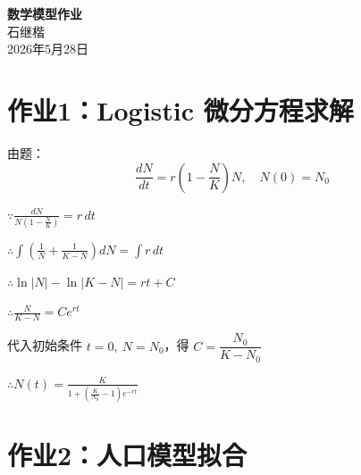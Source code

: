 \documentclass{article}
\begin{document}
	
	\begin{center}
		{\LARGE \textbf{数学模型作业}} \\[0.5cm]
		{\large 石继楷 } \\[0.3cm]
		{\large 2026年5月28日}
	\end{center}
	
	\section{作业1：Logistic 微分方程求解}
	由题：
	\[
	\frac{dN}{dt} = r\left(1-\frac{N}{K}\right)N,\quad N(0)=N_0
	\]
	
	\vspace{0.3cm}
	\noindent
	\(\because \displaystyle \frac{dN}{N\left(1-\frac{N}{K}\right)} = r\,dt\)
	
	\vspace{0.3cm}
	\noindent
	\(\therefore \displaystyle \int \left( \frac{1}{N}+\frac{1}{K-N} \right) dN
	= \int r\,dt\)
	
	\vspace{0.3cm}
	\noindent
	\(\therefore \displaystyle \ln|N| - \ln|K-N| = rt + C\)
	
	\vspace{0.3cm}
	\noindent
	\(\therefore \displaystyle \frac{N}{K-N}=Ce^{rt}\)
	
	\vspace{0.3cm}
	\noindent
	代入初始条件 \(t=0,\ N=N_0\)，得 \(C=\dfrac{N_0}{K-N_0}\)
	
	\vspace{0.3cm}
	\noindent
	\(\therefore \displaystyle N(t)=\frac{K}{1+\left(\frac{K}{N_0}-1\right)e^{-rt}}\)
	
	\section{作业2：人口模型拟合}
	
\end{document}
